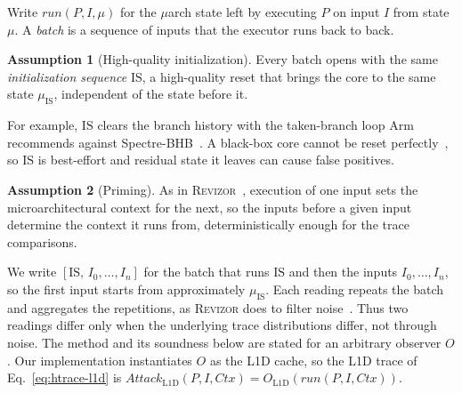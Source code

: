 \documentclass[letterpaper,twocolumn,10pt]{article}
\makeatletter
\theoremstyle{definition}
\newtheorem{assumption}{Assumption}
\providecommand{\run}{\ensuremath{\mathit{run}}}
\providecommand{\IS}{\ensuremath{\mathrm{IS}}}
\providecommand{\obs}{\ensuremath{O}}
\providecommand{\ol}{\ensuremath{O_{\mathrm{L1D}}}}
\providecommand{\Al}{\ensuremath{\mathit{Attack}_{\mathrm{L1D}}}}
\providecommand{\batch}[1]{\ensuremath{[\IS,\,#1]}}
\def\uarch@bold#1#2\@nil{\if b#1\boldmath\fi}
\DeclareRobustCommand{\uarch}{{\expandafter\uarch@bold\f@series\@nil\ensuremath{\mu}}arch\xspace}
\makeatother
\begin{document}
Write $\run(P,I,\mu)$ for the \uarch state left by executing $P$ on input $I$
from state $\mu$. A \emph{batch} is a sequence of inputs that the executor runs back to back.

\begin{assumption}[High-quality initialization]
\label{asm:is}
Every batch opens with the same \emph{initialization sequence} $\IS$, a high-quality reset that
brings the core to the same state $\mu_\IS$, independent of the state before it.
\end{assumption}

\noindent For example, $\IS$ clears the branch history with the taken-branch loop Arm recommends
against Spectre-BHB~\cite{arm_spectre_bhb}. A black-box core cannot be reset
perfectly~\cite{hide_seek}, so $\IS$ is best-effort and residual state it leaves can cause false
positives.

\begin{assumption}[Priming]
\label{asm:prime}
As in \textsc{Revizor}~\cite{revizor}, execution of one input sets the microarchitectural context for
the next, so the inputs before a given input determine the context it runs from, deterministically
enough for the trace comparisons.
\end{assumption}

We write $\batch{I_0,\dots,I_n}$ for the batch that runs $\IS$ and then the inputs
$I_0,\dots,I_n$, so the first input starts from approximately $\mu_\IS$. Each reading repeats the
batch and aggregates the repetitions, as \textsc{Revizor} does to filter noise~\cite{revizor}. Thus two
readings differ only when the underlying trace distributions differ, not through noise. The method
and its soundness below are stated for an arbitrary observer $\obs$. Our implementation instantiates
$\obs$ as the L1D cache, so the L1D trace of Eq.~\eqref{eq:htrace-l1d} is
$\Al(P,I,\mathit{Ctx})=\ol(\run(P,I,\mathit{Ctx}))$.
\end{document}
